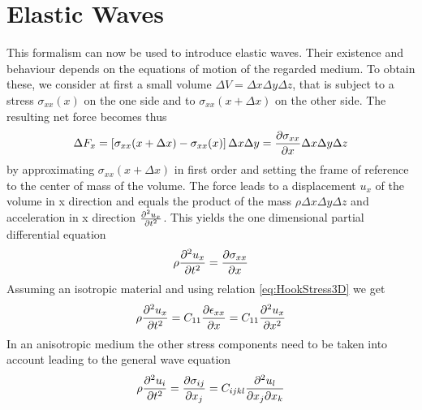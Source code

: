 \section{Elastic Waves}
This formalism can now be used to introduce elastic waves. Their existence and
behaviour depends on the equations of motion of the regarded medium. To obtain
these, we consider at first a small volume $\Delta V = \Delta x \Delta y
    \Delta z$, that is subject to a stress $\sigma_{xx}(x)$ on the one side and
to $\sigma_{xx}(x+\Delta x)$ on the other side. The resulting net force becomes
thus
\begin{equation}
    \Delta F_x = \left[ \sigma_{xx}(x+\Delta x)- \sigma_{xx}(x) \right] \Delta
    x \Delta y = \frac{\partial \sigma_{xx}}{\partial x} \Delta x \Delta y \Delta z
\end{equation}
by approximating $\sigma_{xx}(x+\Delta x)$ in first order and setting the frame
of reference to the center of mass of the volume.
The force leads to a displacement $u_x$ of the volume in x direction and equals
the
product of the mass $\rho\Delta x \Delta y \Delta z$ and acceleration in x
direction $\frac{\partial^2 u_x}{\partial t^2}$. This yields the one dimensional partial
differential equation
\begin{equation}
    \rho \frac{\partial^2 u_x}{\partial t^2} = \frac{\partial \sigma_{xx}}{\partial x}
\end{equation}
Assuming an isotropic material and using relation \ref{eq:HookStress3D} we
get
\begin{equation}
    \rho \frac{\partial^2 u_x}{\partial t^2} = C_{11} \frac{\partial \epsilon_{xx}}{\partial x} = C_{11}\frac{\partial^2 u_x}{\partial x^2}
\end{equation}
In an anisotropic medium the other stress components need to be taken into
account leading to the general wave equation
\begin{equation} \label{eq:wave_eq}
    \rho \frac{\partial^2 u_i}{\partial t^2} = \frac{\partial \sigma_{ij}}{\partial x_j} = C_{ijkl}
    \frac{\partial^2 u_l}{\partial x_j \partial x_k}
\end{equation}


